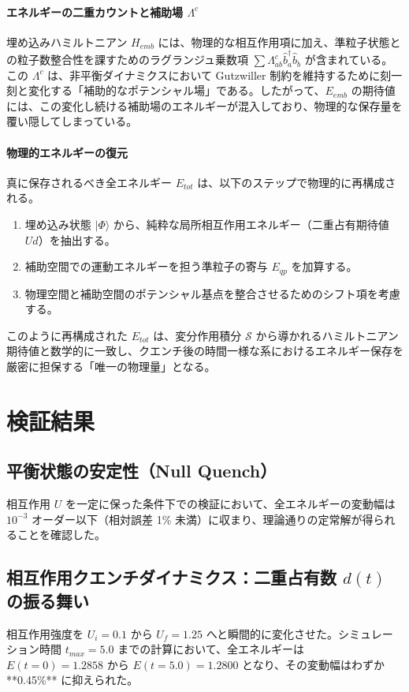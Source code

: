 \documentclass[a4paper,11pt]{ltjarticle}
\begin{document}
\paragraph{エネルギーの二重カウントと補助場 $\Lambda^c$}
埋め込みハミルトニアン $H_{emb}$ には、物理的な相互作用項に加え、準粒子状態との粒子数整合性を課すためのラグランジュ乗数項 $\sum \Lambda^c_{ab} \hat{b}^\dagger_a \hat{b}_b$ が含まれている。この $\Lambda^c$ は、非平衡ダイナミクスにおいて Gutzwiller 制約を維持するために刻一刻と変化する「補助的なポテンシャル場」である。したがって、$E_{emb}$ の期待値には、この変化し続ける補助場のエネルギーが混入しており、物理的な保存量を覆い隠してしまっている。

\paragraph{物理的エネルギーの復元}
真に保存されるべき全エネルギー $E_{tot}$ は、以下のステップで物理的に再構成される。
\begin{enumerate}
    \item 埋め込み状態 $|\Phi\rangle$ から、純粋な局所相互作用エネルギー（二重占有期待値 $U d$）を抽出する。
    \item 補助空間での運動エネルギーを担う準粒子の寄与 $E_{qp}$ を加算する。
    \item 物理空間と補助空間のポテンシャル基点を整合させるためのシフト項を考慮する。
\end{enumerate}
このように再構成された $E_{tot}$ は、変分作用積分 $\mathcal{S}$ から導かれるハミルトニアン期待値と数学的に一致し、クエンチ後の時間一様な系におけるエネルギー保存を厳密に担保する「唯一の物理量」となる。

\section{検証結果}
\subsection{平衡状態の安定性（Null Quench）}
相互作用 $U$ を一定に保った条件下での検証において、全エネルギーの変動幅は $10^{-3}$ オーダー以下（相対誤差 1\% 未満）に収まり、理論通りの定常解が得られることを確認した。

\subsection{相互作用クエンチダイナミクス：二重占有数 $d(t)$ の振る舞い}
相互作用強度を $U_i = 0.1$ から $U_f = 1.25$ へと瞬間的に変化させた。シミュレーション時間 $t_{max}=5.0$ までの計算において、全エネルギーは $E(t=0) = 1.2858$ から $E(t=5.0) = 1.2800$ となり、その変動幅はわずか **0.45\%** に抑えられた。
\end{document}
